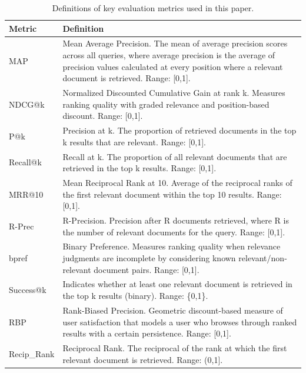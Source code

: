\documentclass[conference]{IEEEtran}
\begin{document}
\begin{table}[t]
\centering
\caption{Definitions of key evaluation metrics used in this paper.}
\label{tab:metric_definitions}
\footnotesize
\begin{tabularx}{\textwidth}{lX}
\toprule
\textbf{Metric} & \textbf{Definition} \\
\midrule
MAP & Mean Average Precision. The mean of average precision scores across all queries, where average precision is the average of precision values calculated at every position where a relevant document is retrieved. Range: [0,1]. \\
NDCG@k & Normalized Discounted Cumulative Gain at rank k. Measures ranking quality with graded relevance and position-based discount. Range: [0,1]. \\
P@k & Precision at k. The proportion of retrieved documents in the top k results that are relevant. Range: [0,1]. \\
Recall@k & Recall at k. The proportion of all relevant documents that are retrieved in the top k results. Range: [0,1]. \\
MRR@10 & Mean Reciprocal Rank at 10. Average of the reciprocal ranks of the first relevant document within the top 10 results. Range: [0,1]. \\
R-Prec & R-Precision. Precision after R documents retrieved, where R is the number of relevant documents for the query. Range: [0,1]. \\
bpref & Binary Preference. Measures ranking quality when relevance judgments are incomplete by considering known relevant/non-relevant document pairs. Range: [0,1]. \\
Success@k & Indicates whether at least one relevant document is retrieved in the top k results (binary). Range: \{0,1\}. \\
RBP & Rank-Biased Precision. Geometric discount-based measure of user satisfaction that models a user who browses through ranked results with a certain persistence. Range: [0,1]. \\
Recip\_Rank & Reciprocal Rank. The reciprocal of the rank at which the first relevant document is retrieved. Range: (0,1]. \\
\bottomrule
\end{tabularx}
\end{table}
\end{document}
